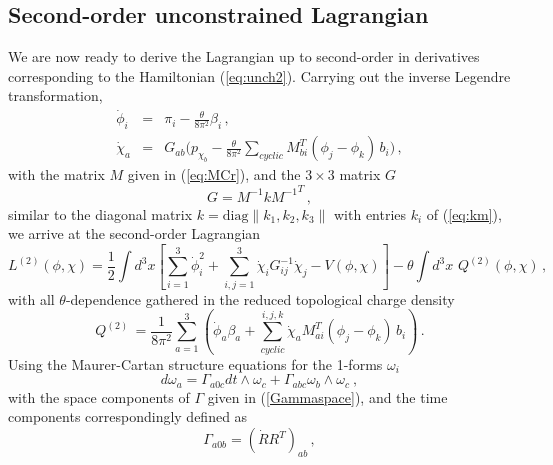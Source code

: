 \documentclass[a4paper,12pt]{article}
\begin{document}

\subsection{Second-order unconstrained Lagrangian}


We are now ready to derive the Lagrangian up to second-order in derivatives
corresponding to the Hamiltonian (\ref{eq:unch2}).
Carrying out the inverse Legendre transformation,
\begin{eqnarray}
\dot{\phi}_i &=& \pi_i - \frac{\theta}{8\pi^2}\beta_i\,,\\
\label{eq:ilt}
\dot \chi_a &=& G_{ab}\Big(p_{\chi_b} -
\frac{\theta}{8\pi^2}\sum_{cyclic}M^T_{bi}
(\phi_j -\phi_k)\,b_{i}\Big)\,,
\end{eqnarray}
with the matrix $M$ given in (\ref{eq:MCr}),
and the $3\times 3$ matrix $G$
\begin{equation}
G= M^{-1} k {M^{-1}}^T\,,
\end{equation}
similar to the diagonal matrix
$k=\mbox{diag}\|{k_1, k_2, k_3}\|$
with entries $k_i$ of (\ref{eq:km}),
we arrive at the second-order Lagrangian
\begin{equation}
\label{Leffgen}
L^{(2)}(\phi, \chi)=\frac{1}{2}\int d^3x\left[\sum_{i=1}^{3}\dot{\phi}_i^2+
\sum_{i,j =1}^{3}\dot{\chi}_iG^{-1}_{ij}\dot{\chi}_j
  - V(\phi, \chi)\right] -
   \theta\int d^3x\,\,Q^{(2)}(\phi, \chi)\,,
\end{equation}
with all $\theta$-dependence gathered in the reduced topological
charge density
\begin{equation} \label{eq:q2}
{Q}^{(2)}\, =\frac{1}{8\pi^2}\sum_{a=1}^3\left( \dot{\phi}_a
\beta_a +\sum^{i,j,k}_{cyclic}\dot{\chi}_a
M^{T}_{ai}(\phi_j-\phi_k)\,b_i\right)\,.
\end{equation}
Using the Maurer-Cartan structure equations for the 1-forms $\omega_i$
\begin{equation}
\label{eg:streq}
d\omega_a  = \Gamma_{a0c} dt\wedge \omega_c +
\Gamma_{abc}\omega_b\wedge \omega_c~,
\end{equation}
with the space components of $\Gamma$ given in
(\ref{Gammaspace}), and the time components correspondingly defined  as
\begin{equation}
\Gamma_{a0b} = \left(\dot{ R} R^T \right)_{ab}\, ,
\end{equation}
\end{document}
